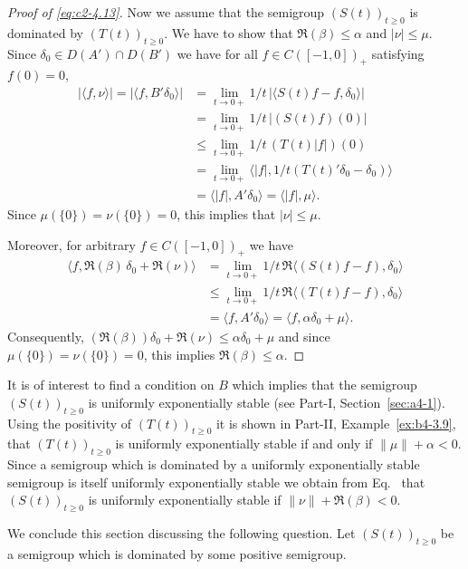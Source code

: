 \begin{example}
\begin{proof}[Proof of \eqref{eq:c2-4.13}]
Now we assume that the semigroup $(S(t))_{t \geq 0}$ is dominated by $(T(t))_{t \geq 0}$.
We have to show that $\Re(\beta) \leq \alpha$ and $|\nu| \leq \mu$.
Since $\delta_{0} \in D(A') \cap D(B')$ we have for all $f \in C([-1,0])_{+}$ satisfying $f(0) = 0$,
\begin{align*}
|\langle f,\nu\rangle| = |\langle f,B'\delta_{0}\rangle| &= \lim_{t \to 0+} 1/t \, |\langle S(t)f - f , \delta_{0}\rangle|\\
%
&= \lim_{t \to 0+} 1/t \, |(S(t)f)(0)|  \\
&\leq \lim_{t \to 0+} 1/t \, (T(t)|f|)(0) \\
&= \lim_{t \to 0+} \langle|f|,1/t(T(t)'\delta_{0} - \delta_{0})\rangle \\
&= \langle|f|,A'\delta_{0}\rangle = \langle|f|,\mu\rangle.
\end{align*}
Since $\mu(\{0\}) = \nu(\{0\}) = 0$, this implies that $|\nu| \leq \mu$.

Moreover, for arbitrary $f \in C([-1,0])_{+}$ we have
\begin{align*}
\langle f,\Re(\beta) \, \delta_{0} + \Re(\nu)\rangle &= \lim_{t \to 0+} 1/t \, \Re\langle(S(t)f - f),\delta_{0}\rangle\\
&\leq \lim_{t \to 0+} 1/t \, \Re\langle(T(t)f - f),\delta_{0}\rangle \\
&= \langle f,A'\delta_{0}\rangle = \langle f,\alpha\delta_{0} + \mu\rangle.
\end{align*}
Consequently, $(\Re(\beta))\delta_{0} + \Re(\nu) \leq \alpha\delta_{0} + \mu$ and since $\mu(\{0\}) = \nu(\{0\}) = 0$, this implies $\Re(\beta) \leq \alpha$. 
\end{proof}
\end{example}
\begin{remark*}
It is of interest to find a condition on $B$ which implies that the semigroup $(S(t))_{t \geq 0}$ is uniformly exponentially stable (see Part-I, Section~\ref{sec:a4-1}).
Using the positivity of\/ $(T(t))_{t \geq 0}$ it is shown in Part-II, Example~\ref{ex:b4-3.9}, that
$(T(t))_{t \geq 0}$ is uniformly exponentially stable if and only if\/ $\|\mu\| + \alpha < 0$.
Since a semigroup which is dominated by a uniformly exponentially stable semigroup is itself uniformly exponentially stable we obtain from Eq.~ that $(S(t))_{t \geq 0}$ is uniformly exponentially stable if\/ $\|\nu\| + \Re(\beta) < 0$.
\end{remark*}
We conclude this section discussing the following question.
Let $(S(t))_{t \geq 0}$ be a semigroup which is dominated by some positive semigroup.
